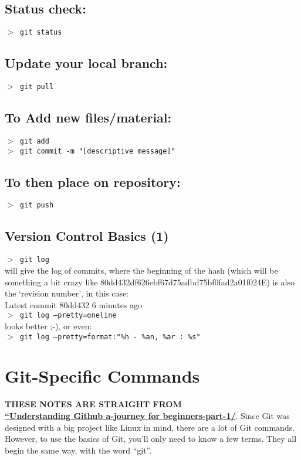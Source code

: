 \documentclass[11pt,a4paper]{article}
\begin{document}
    \subsection{Status check:}
   {\tt $>$ git status}\\

 
    \subsection{Update your local branch:}
    {\tt $>$ git pull}\\


    \subsection{To Add new files/material:}
    {\tt $>$ git add\\
     $>$ git commit -m "[descriptive message]" } \\

   \subsection{To then place on repository:}
   {\tt $>$ git push }\\


   \subsection{Version Control Basics (1)}
   {\tt  $>$ git log}\\
   will give the log of commits, where the beginning of the hash
   (which will be something a bit crazy like 80dd432df626ebf67d75adbd75bf0fad2a01f024E)
   is also the `revision number', in this case: \\
   Latest commit 80dd432 6 minutes ago \\

   \noindent
   {\tt $>$ git log --pretty=oneline}\\ 
   looks better ;-), or even: \\

   \noindent
   {\tt $>$ git log --pretty=format:"\%h - \%an, \%ar : \%s"} \\


\newpage
\section{Git-Specific Commands}
{\bf THESE NOTES ARE STRAIGHT FROM\\
\href{http://readwrite.com/2013/09/30/understanding-github-a-journey-for-beginners-part-1/}{``Understanding Github a-journey for beginners-part-1/}}.
Since Git was designed with a big project like Linux in mind, there
are a lot of Git commands. However, to use the basics of Git, you’ll
only need to know a few terms. They all begin the same way, with the
word ``git''.
\end{document}

